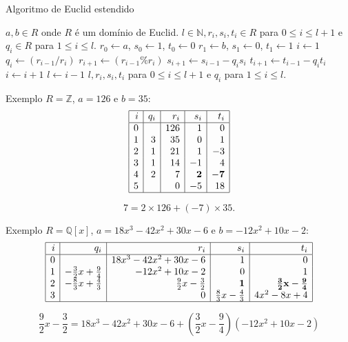 \documentclass{beamer}
\newcommand{\ZZ}{\mathbb Z}
\newcommand{\NN}{\mathbb N}
\newcommand{\QQ}{\mathbb Q}
\begin{document}
\begin{frame}[fragile]{Algoritmo de Euclid estendido}
\begin{algorithmic}
\REQUIRE $a,b \in R$ onde $R$ é um domínio de Euclid.
\ENSURE $l\in \NN, r_i,s_i,t_i \in R$ para $0\leq i\leq l+1$ e $q_i\in R$ para $1\leq i \leq l$.
	\STATE $r_0 \leftarrow a$, $s_0 \leftarrow 1$, $t_0\leftarrow 0$
	\STATE $r_1 \leftarrow b$, $s_1 \leftarrow 0$, $t_1\leftarrow 1$
	\STATE $i \leftarrow 1$
		\STATE $q_i \leftarrow (r_{i-1}/ r_i)$
		\STATE $r_{i+1}\leftarrow (r_{i-1}\% r_i)$
		\STATE $s_{i+1}\leftarrow s_{i-1} - q_is_i$
		\STATE $t_{i+1}\leftarrow t_{i-1} - q_it_i$
		\STATE $i\leftarrow i+1$
	\ENDWHILE
	\STATE $l\leftarrow i-1$
	\RETURN $l, r_i, s_i, t_i$ para $0\leq i \leq l+1$ e $q_i$ para $1\leq i \leq l$.
\end{algorithmic}

\end{frame}


\begin{frame}{}
\begin{block}{Exemplo}
$R=\ZZ$, $a=126$ e $b=35$:
$$\begin{array}{|r|r|r|r|r|}\hline
i & q_i & r_i & s_i & t_i \\\hline
0 &   & 126 & 1 &0 \\
1 & 3 & 35 & 0 &1 \\
2 & 1 & 21 & 1 & -3 \\
3 & 1 & 14 & -1 & 4 \\
4 &  2 & 7 & {\bf 2} & {\bf -7} \\
5 &   & 0 & -5 & 18 \\\hline
\end{array}$$
\end{block}
$$7 = 2\times 126 + (-7)\times 35.$$
\end{frame}

\begin{frame}{}
\begin{block}{Exemplo}
$R=\QQ[x]$, $a=18x^3-42x^2+30x-6$ e $b=-12x^2+10x-2$:
$$\begin{array}{|r|r|r|r|r|}\hline
i & q_i                         &               r_i         & s_i                        & t_i \\\hline
0 &                             & 18x^3-42x^2+30x-6         & 1                          & 0 \\
1 & -\frac{3}{2}x + \frac{9}{4} &      -12x^2+10x-2         & 0                          & 1 \\
2 & -\frac{8}{3}x + \frac{4}{3} &  \frac{9}{2}x-\frac{3}{2} &{\bf 1}                     & {\bf \frac{3}{2}x-\frac{9}{4}} \\
3 &                             &                         0 & \frac{8}{3}x - \frac{4}{3} & 4x^2-8x+4 \\\hline 
\end{array}$$
\end{block}
$$ \boxed{\frac{9}{2}x-\frac{3}{2}  = 18x^3-42x^2+30x-6 +  \left(\frac{3}{2}x-\frac{9}{4}\right)\left(-12x^2+10x-2\right)  }$$
\end{frame}
\end{document}
